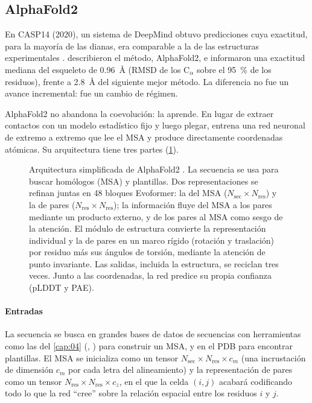 \subsection{AlphaFold2}

En CASP14 (2020), un sistema de DeepMind obtuvo predicciones cuya exactitud, para la mayoría de las dianas, era comparable a la de las estructuras experimentales \parencite{c15-kryshtafovych2021}. \textcite{c15-jumper2021} describieron el método, AlphaFold2, e informaron una exactitud mediana del esqueleto de \SI{0,96}{\angstrom} (RMSD de los C$_\alpha$ sobre el \SI{95}{\percent} de los residuos), frente a \SI{2,8}{\angstrom} del siguiente mejor método. La diferencia no fue un avance incremental: fue un cambio de régimen.

AlphaFold2 no abandona la coevolución: la aprende. En lugar de extraer contactos con un modelo estadístico fijo y luego plegar, entrena una red neuronal de extremo a extremo que lee el MSA y produce directamente coordenadas atómicas. Su arquitectura tiene tres partes (\cref{fig:15-af2}).

\begin{figure}[t]
\centering
\resizebox{\linewidth}{!}{}
\caption[Arquitectura de AlphaFold2]{Arquitectura simplificada de AlphaFold2 \parencite{c15-jumper2021}. La secuencia se usa para buscar homólogos (MSA) y plantillas. Dos representaciones se refinan juntas en 48 bloques Evoformer: la del MSA ($N_{\mathrm{sec}}\times N_{\mathrm{res}}$) y la de pares ($N_{\mathrm{res}}\times N_{\mathrm{res}}$); la información fluye del MSA a los pares mediante un producto externo, y de los pares al MSA como sesgo de la atención. El módulo de estructura convierte la representación individual y la de pares en un marco rígido (rotación y traslación) por residuo más sus ángulos de torsión, mediante la atención de punto invariante. Las salidas, incluida la estructura, se reciclan tres veces. Junto a las coordenadas, la red predice su propia confianza (pLDDT y PAE).}
\label{fig:15-af2}
\end{figure}

\paragraph{Entradas} La secuencia se busca en grandes bases de datos de secuencias con herramientas como las del \cref{cap:04} (, ) para construir un MSA, y en el PDB para encontrar plantillas. El MSA se inicializa como un tensor $N_{\mathrm{sec}}\times N_{\mathrm{res}}\times c_m$ (una incrustación de dimensión $c_m$ por cada letra del alineamiento) y la representación de pares como un tensor $N_{\mathrm{res}}\times N_{\mathrm{res}}\times c_z$, en el que la celda $(i,j)$ acabará codificando todo lo que la red ``cree'' sobre la relación espacial entre los residuos $i$ y $j$.

